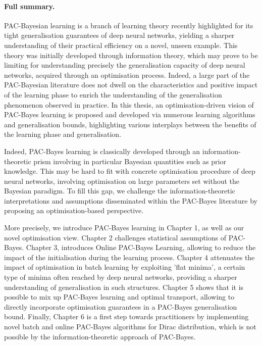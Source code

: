 \paragraph*{Full summary.}
PAC-Bayesian learning is a branch of learning theory recently highlighted for its tight generalisation guarantees of deep neural networks, yielding a sharper understanding of their practical efficiency on a novel, unseen example. This theory was initially developed through information theory, which may prove to be limiting for understanding precisely the generalisation capacity of deep neural networks, acquired through an optimisation process. Indeed, a large part of the PAC-Bayesian literature does not dwell on the characteristics and positive impact of the learning phase to enrich the understanding of the generalisation phenomenon observed in practice. In this thesis, an optimisation-driven vision of PAC-Bayes learning is proposed and developed via numerous learning algorithms and generalisation bounds, highlighting various interplays between the benefits of the learning phase and generalisation.

Indeed, PAC-Bayes learning is classically developed through an information-theoretic prism involving in particular Bayesian quantities such as prior knowledge. This may be hard to fit with concrete optimisation procedure of deep neural networks, involving optimisation on large parameters set without the Bayesian paradigm. To fill this gap, we challenge the information-theoretic interpretations and assumptions disseminated within the PAC-Bayes literature by proposing an optimisation-based perspective. 

More precisely, we introduce PAC-Bayes learning in Chapter 1, as well as our novel optimisation view. Chapter 2 challenges statistical assumptions of PAC-Bayes. Chapter 3, introduces Online PAC-Bayes Learning, allowing to reduce the impact of the initialisation during the learning process. Chapter 4 attenuates the impact of optimisation in batch learning by exploiting 'flat minima', a certain type of minima often reached by deep neural networks, providing a sharper understanding of generalisation in such structures. Chapter 5 shows that it is possible to mix up PAC-Bayes learning and optimal transport, allowing to directly incorporate optimisation guarantees in a PAC-Bayes generalisation bound. Finally, Chapter 6 is a first step towards practitioners by implementing novel batch and online PAC-Bayes algorithms for Dirac distribution, which is not possible by the information-theoretic approach of PAC-Bayes.